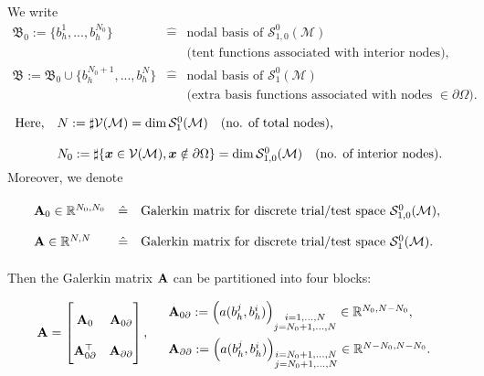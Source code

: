 	We write
	\[\begin{array}{lll}
		\mathfrak{B}_0:=\{b_h^1,...,b_h^{N_0}\} &\hat{=} &
		\textrm{nodal basis of } \mathcal{S}_{1,0}^0(\mathcal{M})\\
		& &\textrm{(tent functions associated with interior nodes),}\\
		\mathfrak{B}:=\mathfrak{B}_0\cup\{b_h^{N_0+1},...,b_h^N\}
		&\hat{=}&\textrm{nodal basis of }\mathcal{S}_1^0(\mathcal{M})\\
		& &\textrm{(extra basis functions associated with nodes
			$\in\partial\Omega$).}
	\end{array}\]
	$\begin{array}{ll}
		\textrm{Here,} & N:=\sharp\mathcal{V}(\mathcal{M})=\mathrm{dim}\,
		\mathcal{S}_1^0(\mathcal{M})\quad\textrm{(no. of total nodes),}\\
		&N_0:=\sharp\{\bx\in\mathcal{V}(\mathcal{M}),\bx\notin\partial\Omega\}
		=\mathrm{dim}\,\mathcal{S}_{1,0}^0(\mathcal{M})\quad
		\textrm{(no. of interior nodes).}
	\end{array}$\\[5pt]
	Moreover, we denote
	\[\begin{array}{lll}
		\bA_0\in\mathbb{R}^{N_0,N_0}&\hat{=} &
		\textrm{Galerkin matrix for discrete trial/test space } 
		\mathcal{S}_{1,0}^0(\mathcal{M}),\\
		\bA\in\mathbb{R}^{N,N}&\hat{=} &
		\textrm{Galerkin matrix for discrete trial/test space }
		 \mathcal{S}_1^0(\mathcal{M}).
	\end{array}\]

	Then the Galerkin matrix $\mathbf{A}$ can be partitioned into four 
	blocks:\vspace{-7pt}
	\[\bA = \begin{bmatrix}
		\bA_0 & \bA_{0\partial}\\
		\bA_{0\partial}^{\top} & \bA_{\partial\partial}
	\end{bmatrix},\quad 
	\def\arraystretch{2}
	\begin{array}{l}
		\bA_{0\partial}:=\left(a(b_h^j,b_h^i)\right)_{
			\substack{i=1,...,N\\j=N_0+1,...,N}}\in\mathbb{R}^{N_0,N-N_0},\\
		\vspace{3pt}
		\bA_{\partial\partial}:=\left(a(b_h^j,b_h^i)\right)_{
			\substack{i=N_0+1,...,N\\j=N_0+1,...,N}}\in\mathbb{R}^{N-N_0,N-N_0}.
	\end{array}\]

